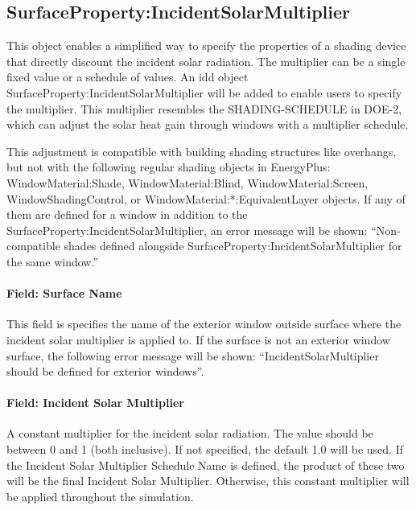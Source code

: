 \subsection{SurfaceProperty:IncidentSolarMultiplier}

This object enables a simplified way to specify the properties of a shading
device that directly discount the incident solar radiation. The multiplier can
be a single fixed value or a schedule of values. An idd object
SurfaceProperty:IncidentSolarMultiplier will be added to enable users to specify
the multiplier. This multiplier resembles the SHADING-SCHEDULE in DOE-2, which
can adjust the solar heat gain through windows with a multiplier schedule.

This adjustment is compatible with building shading structures like overhangs,
but not with the following regular shading objects in EnergyPlus:
WindowMaterial:Shade, WindowMaterial:Blind, WindowMaterial:Screen,
WindowShadingControl, or WindowMaterial:*:EquivalentLayer objects. If any of
them are defined for a window in addition to the
SurfaceProperty:IncidentSolarMultiplier, an error message will be shown:
``Non-compatible shades defined alongside SurfaceProperty:IncidentSolarMultiplier
for the same window.''

\paragraph{Field: Surface Name}\label{field-surface-name-IncidentSolarMultiplier}

This field is specifies the name of the exterior window outside surface where
the incident solar multiplier is applied to. If the surface is not an exterior
window surface, the following error message will be shown:
``IncidentSolarMultiplier should be defined for exterior windows''.

\paragraph{Field: Incident Solar Multiplier}\label{field-shading-multiplier-IncidentSolarMultiplier}

A constant multiplier for the incident solar radiation. The value should be
between 0 and 1 (both inclusive). If not specified, the default 1.0 will be
used. If the Incident Solar Multiplier Schedule Name is defined, the product of
these two will be the final Incident Solar Multiplier. Otherwise, this constant
multiplier will be applied throughout the simulation.

